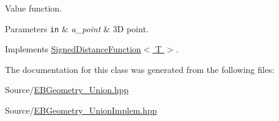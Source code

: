 Value function. 


\begin{DoxyParams}[1]{Parameters}
\mbox{\tt in}  & {\em a\+\_\+point} & 3D point. \\
\hline
\end{DoxyParams}


Implements \hyperlink{classSignedDistanceFunction_af5912280ca51dc21a2d6949a30ec7d21}{Signed\+Distance\+Function$<$ T $>$}.



The documentation for this class was generated from the following files\+:\begin{DoxyCompactItemize}
\item 
Source/\hyperlink{EBGeometry__Union_8hpp}{E\+B\+Geometry\+\_\+\+Union.\+hpp}\item 
Source/\hyperlink{EBGeometry__UnionImplem_8hpp}{E\+B\+Geometry\+\_\+\+Union\+Implem.\+hpp}\end{DoxyCompactItemize}
